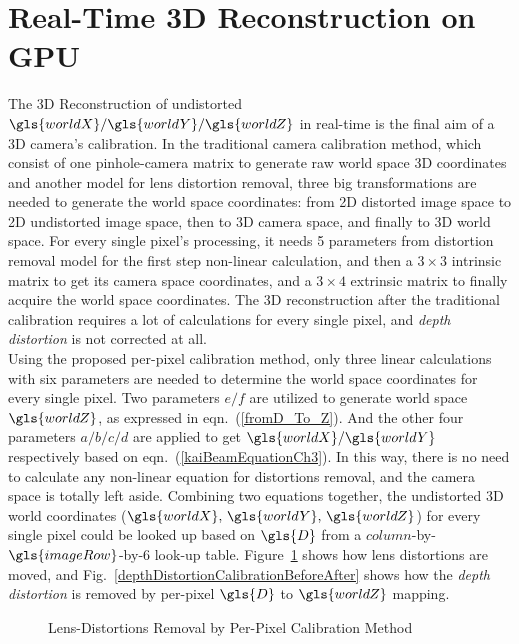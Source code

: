 \section{Real-Time \gls{3D} Reconstruction on \gls{GPU}}
%
The \gls{3D} Reconstruction of undistorted \(\gls{worldX}/\gls{worldY}/\gls{worldZ}\) in real-time is the final aim of a \gls{3D} camera's calibration. In the traditional camera calibration method, which consist of one pinhole-camera matrix to generate raw world space \gls{3D} coordinates and another model for lens distortion removal, three big transformations are needed to generate the world space coordinates: from 2D distorted image space to 2D undistorted image space, then to \gls{3D} camera space, and finally to \gls{3D} world space. For every single pixel's processing, it needs 5 parameters from distortion removal model for the first step non-linear calculation, and then a $3\times3$ intrinsic matrix to get its camera space coordinates, and a $3\times4$ extrinsic matrix to finally acquire the world space coordinates. The \gls{3D} reconstruction after the traditional calibration requires a lot of calculations for every single pixel, and \emph{depth distortion} is not corrected at all.
\\\indent
%
Using the proposed per-pixel calibration method, only three linear calculations with six parameters are needed to determine the world space coordinates for every single pixel. Two parameters \(e/f\) are utilized to generate world space \(\gls{worldZ}\), as expressed in eqn.~(\ref{fromD_To_Z}). And the other four parameters \(a/b/c/d\) are applied to get \(\gls{worldX}/\gls{worldY}\) respectively based on eqn.~(\ref{kaiBeamEquationCh3}). In this way, there is no need to calculate any non-linear equation for distortions removal, and the camera space is totally left aside. Combining two equations together, the undistorted \gls{3D} world coordinates (\(\gls{worldX}, \, \gls{worldY}, \, \gls{worldZ}\)) for every single pixel could be looked up based on \(\gls{D}\) from a \(column\)-by-\(\gls{imageRow}\)-by-\(6\) look-up table. Figure~\ref{perPixelCalibrationBeforeAfter} shows how lens distortions are moved, and Fig.~\ref{depthDistortionCalibrationBeforeAfter} shows how the \emph{depth distortion} is removed by per-pixel \(\gls{D}\) to \(\gls{worldZ}\) mapping.
\begin{figure}[t]
\centering
\hspace*{-0.3cm}
%
%
\caption{Lens-Distortions Removal by Per-Pixel Calibration Method}
\label{perPixelCalibrationBeforeAfter}
\end{figure}%
